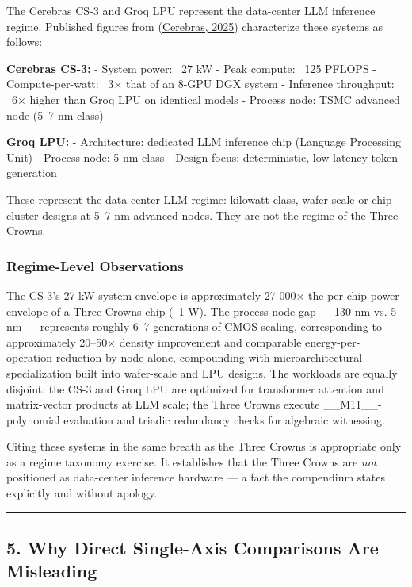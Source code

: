 The Cerebras CS-3 and Groq LPU represent the data-center LLM inference regime. Published figures from (\href{https://www.cerebras.ai/blog/cerebras-cs-3-vs-groq-lpu}{Cerebras, 2025}) characterize these systems as follows:

\textbf{Cerebras CS-3:}
- System power: ~27 kW
- Peak compute: ~125 PFLOPS
- Compute-per-watt: ~3$\times$ that of an 8-GPU DGX system
- Inference throughput: ~6$\times$ higher than Groq LPU on identical models
- Process node: TSMC advanced node (5--7 nm class)

\textbf{Groq LPU:}
- Architecture: dedicated LLM inference chip (Language Processing Unit)
- Process node: 5 nm class
- Design focus: deterministic, low-latency token generation

These represent the data-center LLM regime: kilowatt-class, wafer-scale or chip-cluster designs at 5--7 nm advanced nodes. They are not the regime of the Three Crowns.

\subsubsection{Regime-Level Observations}

The CS-3's 27 kW system envelope is approximately 27 000$\times$ the per-chip power envelope of a Three Crowns chip (~1 W). The process node gap --- 130 nm vs. 5 nm --- represents roughly 6--7 generations of CMOS scaling, corresponding to approximately 20--50$\times$ density improvement and comparable energy-per-operation reduction by node alone, compounding with microarchitectural specialization built into wafer-scale and LPU designs. The workloads are equally disjoint: the CS-3 and Groq LPU are optimized for transformer attention and matrix-vector products at LLM scale; the Three Crowns execute \_\_M11\_\_-polynomial evaluation and triadic redundancy checks for algebraic witnessing.

Citing these systems in the same breath as the Three Crowns is appropriate only as a regime taxonomy exercise. It establishes that the Three Crowns are \textit{not} positioned as data-center inference hardware --- a fact the compendium states explicitly and without apology.

\noindent\rule{\textwidth}{0.4pt}

\subsection{5. Why Direct Single-Axis Comparisons Are Misleading}

